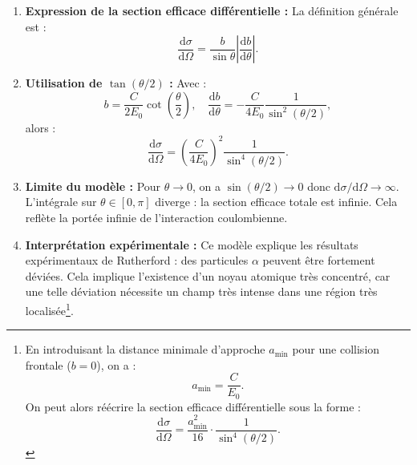 \documentclass[a4paper,10pt]{report}
\begin{document}
	\begin{enumerate}
		\item \textbf{Expression de la section efficace différentielle :}
		La définition générale est :
		\[
		\frac{\mathrm{d}\sigma}{\mathrm{d}\Omega} = \frac{b}{\sin\theta} \left| \frac{\mathrm{d}b}{\mathrm{d}\theta} \right|.
		\]
		
		\item \textbf{Utilisation de $\tan(\theta/2)$ :} Avec :
		\[
		b = \frac{C}{2E_0} \cot\left(\frac{\theta}{2}\right), \quad \frac{\mathrm{d}b}{\mathrm{d}\theta} = -\frac{C}{4E_0} \frac{1}{\sin^2(\theta/2)},
		\]
		alors :
		\[
		\frac{\mathrm{d}\sigma}{\mathrm{d}\Omega} = \left( \frac{C}{4E_0} \right)^2 \frac{1}{\sin^4(\theta/2)}.
		\]
		
		\item \textbf{Limite du modèle :} Pour $\theta \to 0$, on a $\sin(\theta/2) \to 0$ donc $\mathrm{d}\sigma/\mathrm{d}\Omega \to \infty$. L’intégrale sur $\theta \in [0,\pi]$ diverge : la section efficace totale est infinie. Cela reflète la portée infinie de l’interaction coulombienne.
		
		\item \textbf{Interprétation expérimentale :} Ce modèle explique les résultats expérimentaux de Rutherford : des particules $\alpha$ peuvent être fortement déviées. Cela implique l’existence d’un noyau atomique très concentré, car une telle déviation nécessite un champ très intense dans une région très localisée\footnote{En introduisant la distance minimale d’approche $a_{\min}$ pour une collision frontale ($b=0$), on a :
			\[
			a_{\min} = \frac{C}{E_0}.
			\]
			On peut alors réécrire la section efficace différentielle sous la forme :
			\[
			\boxed{\frac{\mathrm{d}\sigma}{\mathrm{d}\Omega} = \frac{a_{\min}^2}{16} \cdot \frac{1}{\sin^4(\theta/2)}}.
			\]}.
	\end{enumerate}
	
\end{document}

